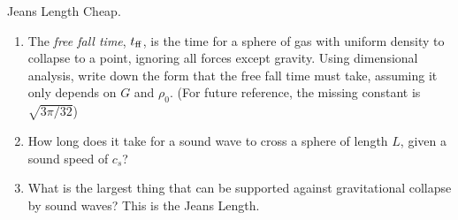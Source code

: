 Jeans Length Cheap.
     \begin{enumerate}
         \item {} The \emph{free fall time}, $t_{\rm{ff}}$, is the time for a sphere of gas with uniform
       density to collapse to a point, ignoring all forces except gravity.  Using dimensional analysis, write down the
       form that the free fall time must take, assuming it only depends on $G$ and
       $\rho_0$.  (For future reference, the missing constant is $\sqrt{3
       \pi/32}$)
   \item {} How long does it take for a sound wave to cross a sphere of
       length $L$, given a sound speed of $c_s$?
   \item {} What is the largest thing that can be supported against
       gravitational collapse by sound waves?  This is the Jeans Length.
       \end{enumerate}


